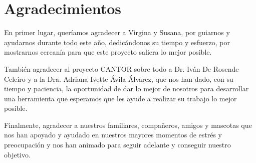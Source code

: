 
\chapter*{Agradecimientos}


En primer lugar, quer\'{i}amos agradecer a Virgina y Susana, por guiarnos y ayudarnos durante todo este a\~{n}o, dedic\'{a}ndonos su tiempo y esfuerzo, por mostrarnos cercan\'{i}a  para que este proyecto saliera lo mejor posible.

Tambi\'{e}n agradecer al proyecto CANTOR sobre todo a Dr. Iv\'{a}n De Rosende Celeiro y a la Dra. Adriana Ivette \'{A}vila \'{A}lvarez, que nos han dado, con su tiempo y paciencia, la oportunidad de dar lo mejor de nosotros para desarrollar una herramienta que esperamos que les ayude a realizar su trabajo lo mejor posible.

Finalmente, agradecer a nuestros familiares, compa\~{n}eros, amigos y mascotas que nos han apoyado y ayudado en nuestros mayores momentos de estr\'{e}s y preocupaci\'{o}n y nos han animado para seguir adelante y conseguir nuestro objetivo.












